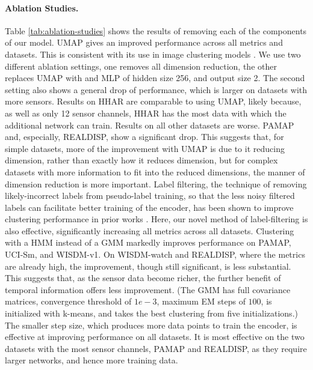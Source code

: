 \documentclass[wcp]{jmlr}
\begin{document}
\paragraph{Ablation Studies.}
Table \ref{tab:ablation-studies} shows the results of removing each of the components of our model. 
UMAP gives an improved performance across all metrics and datasets. This is consistent with its use in image clustering models \citep{allaoui2020considerably}. We use two different ablation settings, one removes all dimension reduction, the other replaces UMAP with and MLP of hidden size 256, and output size 2. The second setting also shows a general drop of performance, which is larger on datasets with more sensors. Results on HHAR are comparable to using UMAP, likely because, as well as only 12 sensor channels, HHAR has the most data with which the additional network can train. Results on all other datasets are worse.
PAMAP and, especially, REALDISP, show a significant drop. This suggests that, for simple datasets, more of the improvement with UMAP is due to it reducing dimension, rather than exactly how it reduces dimension, but for complex datasets with more information to fit into the reduced dimensions, the manner of dimension reduction is more important. 
Label filtering, the technique of removing likely-incorrect labels from pseudo-label training, so that the less noisy filtered labels can facilitate better training of the encoder, has been shown to improve clustering performance in prior works 
\citep{mrabah2020deep,mahon2021selective}. Here, our novel method of label-filtering is also effective, significantly increasing all metrics across all datasets.
Clustering with a HMM instead of a GMM markedly improves performance on PAMAP, UCI-Sm, and WISDM-v1. On WISDM-watch and REALDISP, where the metrics are already high, the improvement, though still significant, is less substantial. This suggests that, as the sensor data become richer, the further benefit of temporal information offers less improvement. (The GMM has full covariance matrices, convergence threshold of $1e-3$, maximum EM steps of $100$, is initialized with k-means, and takes the best clustering from five initializations.) 
The smaller step size, which produces more data points to train the encoder, is effective at improving performance on all datasets. It is most effective on the two datasets with the most sensor channels, PAMAP and REALDISP, as they require larger networks, and hence more training data.
\end{document}

